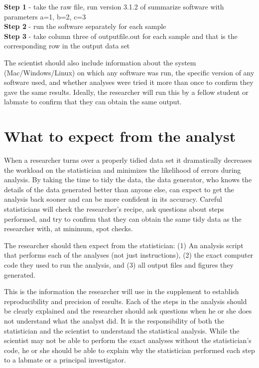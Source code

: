 \documentclass[12pt]{article}
\begin{document}
\noindent \textbf{Step 1} - take the raw file, run version 3.1.2 of
summarize software with parameters a=1, b=2, c=3\\
\textbf{Step 2} - run the software separately for each sample\\
\textbf{Step 3} - take column three of outputfile.out for each sample
and that is the corresponding row in the output data set

The scientist should also include information about the system
(Mac/Windows/Linux) on which any software was run, the specific version
of any software used, and whether analyses were tried it more than once
to confirm they gave the same results. Ideally, the researcher will run
this by a fellow student or labmate to confirm that they can obtain the
same output.

\section{What to expect from the
analyst}\label{what-to-expect-from-the-analyst}

When a researcher turns over a properly tidied data set it dramatically
decreases the workload on the statistician and minimizes the likelihood
of errors during analysis. By taking the time to tidy the data, the data
generator, who knows the details of the data generated better than
anyone else, can expect to get the analysis back sooner and can be more
confident in its accuracy. Careful statisticians will check the
researcher's recipe, ask questions about steps performed, and try to
confirm that they can obtain the same tidy data as the researcher with,
at minimum, spot checks.

The researcher should then expect from the statistician: (1) An analysis
script that performs each of the analyses (not just instructions), (2)
the exact computer code they used to run the analysis, and (3) all
output files and figures they generated.

This is the information the researcher will use in the supplement to
establish reproducibility and precision of results. Each of the steps in
the analysis should be clearly explained and the researcher should ask
questions when he or she does not understand what the analyst did. It is
the responsibility of both the statistician and the scientist to
understand the statistical analysis. While the scientist may not be able
to perform the exact analyses without the statistician's code, he or she
should be able to explain why the statistician performed each step to a
labmate or a principal investigator.
\end{document}
